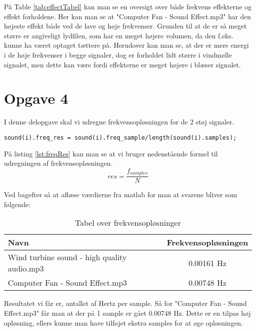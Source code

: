 \documentclass[../main.tex]{subfiles}
\begin{document}
På Table \ref{tab:effectTabel} kan man se en oversigt over både frekvens effekterne og effekt forholdene.
Her kan man se at "Computer Fan - Sound Effect.mp3" har den højeste effekt både ved de lave og høje frekvenser. 
Grunden til at de er så meget større er angiveligt lydfilen, som har en meget højere volumen, da den f.eks. kunne ha været optaget tættere på.
Herudover kan man se, at der er mere energi i de høje frekvenser i begge signaler, dog er forholdet lidt større i vindmølle signalet, men dette kan være fordi effekterne er meget højere i blæser signalet.

\section{Opgave 4}
I denne delopgave skal vi udregne frekvensopløsningen for de 2 støj signaler.

\begin{lstlisting}[caption=Udregning af effektforhold, label=lst:freqRes]
% Calculate the frequency resolution
sound(i).freq_res = sound(i).freq_sample/length(sound(i).samples);
\end{lstlisting}

På listing \ref{lst:freqRes} kan man se at vi bruger nedenstående formel til udregningen af frekvensopløsningen.
\[res = \frac{f_{samples}}{N}\]

Ved bagefter så at aflæse værdierne fra matlab for man at svarene bliver som følgende:

\begin{table}[h]
    \centering
    \begin{tabular}{|l|c|}
    \hline
    Navn & Frekvensopløsningen \\ 
    \hline
    Wind turbine sound - high quality audio.mp3 & 0.00161 Hz \\
    \hline
    Computer Fan - Sound Effect.mp3 & 0.00748 Hz \\
    \hline
    \end{tabular}
    \caption{Tabel over frekvensopløsninger}
    \label{tab:freqResTable}
\end{table}

Resultatet vi får er, antallet af Hertz per sample. Så for "Computer Fan - Sound Effect.mp3" får man at der på 1 sample er gået 0.00748 Hz. Dette er en tilpas høj opløsning, ellers kunne man have tilføjet ekstra samples for at øge opløsningen.
\end{document}
